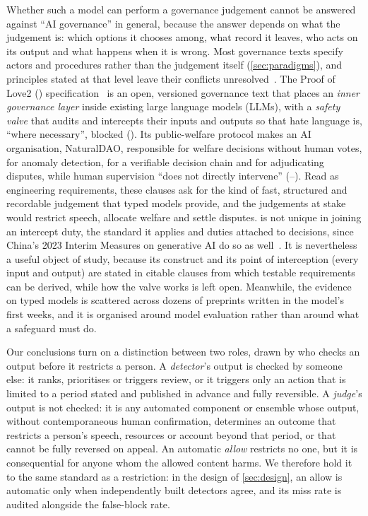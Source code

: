 Whether such a model can perform a governance judgement cannot be answered against ``AI governance'' in general, because the answer depends on what the judgement is: which options it chooses among, what record it leaves, who acts on its output and what happens when it is wrong.
Most governance texts specify actors and procedures rather than the judgement itself (\cref{sec:paradigms}), and principles stated at that level leave their conflicts unresolved~\cite{whittlestone2019role}.
The Proof of Love2 (\pol{}) specification~\cite{pol2text,pol2en} is an open, versioned governance text that places an \emph{inner governance layer} inside existing large language models (LLMs), with a \emph{safety valve} that audits and intercepts their inputs and outputs so that hate language is, ``where necessary'', blocked ().
Its public-welfare protocol makes an AI organisation, NaturalDAO, responsible for welfare decisions without human votes, for anomaly detection, for a verifiable decision chain and for adjudicating disputes, while human supervision ``does not directly intervene'' (--).
Read as engineering requirements, these clauses ask for the kind of fast, structured and recordable judgement that typed models provide, and the judgements at stake would restrict speech, allocate welfare and settle disputes.
\pol{} is not unique in joining an intercept duty, the standard it applies and duties attached to decisions, since China's 2023 Interim Measures on generative AI do so as well~\cite{cac2023genai}.
It is nevertheless a useful object of study, because its construct and its point of interception (every input and output) are stated in citable clauses from which testable requirements can be derived, while how the valve works is left open.
Meanwhile, the evidence on typed models is scattered across dozens of preprints written in the model's first weeks, and it is organised around model evaluation rather than around what a safeguard must do.

Our conclusions turn on a distinction between two roles, drawn by who checks an output before it restricts a person.
A \emph{detector}'s output is checked by someone else: it ranks, prioritises or triggers review, or it triggers only an action that is limited to a period stated and published in advance and fully reversible.
A \emph{judge}'s output is not checked: it is any automated component or ensemble whose output, without contemporaneous human confirmation, determines an outcome that restricts a person's speech, resources or account beyond that period, or that cannot be fully reversed on appeal.
An automatic \emph{allow} restricts no one, but it is consequential for anyone whom the allowed content harms.
We therefore hold it to the same standard as a restriction: in the design of \cref{sec:design}, an allow is automatic only when independently built detectors agree, and its miss rate is audited alongside the false-block rate.


